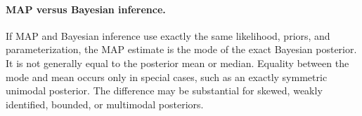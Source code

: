 \paragraph{MAP versus Bayesian inference.}
If MAP and Bayesian inference use exactly the same likelihood, priors, and
parameterization, the MAP estimate is the mode of the exact Bayesian posterior.
It is not generally equal to the posterior mean or median. Equality between the
mode and mean occurs only in special cases, such as an exactly symmetric unimodal
posterior. The difference may be substantial for skewed, weakly identified, bounded,
or multimodal posteriors.

